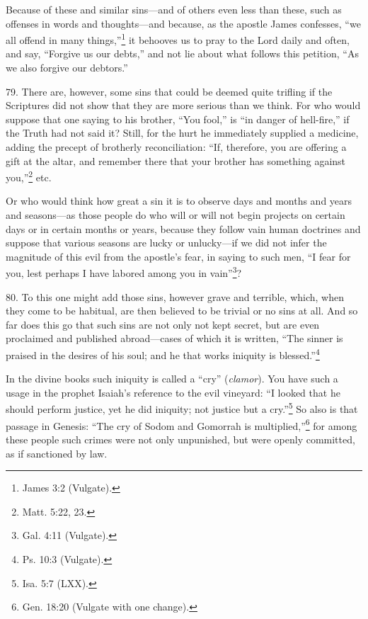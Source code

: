 Because of these and similar sins—and of others even less than these, such as offenses in words and thoughts—and because, as the apostle James confesses, ``we all offend in many things,''\footnote{James 3:2 (Vulgate).} it behooves us to pray to the Lord daily and often, and say, ``Forgive us our debts,'' and not lie about what follows this petition, ``As we also forgive our debtors.''

79. There are, however, some sins that could be deemed quite trifling if the Scriptures did not show that they are more serious than we think. For who would suppose that one saying to his brother, ``You fool,'' is ``in danger of hell-fire,'' if the Truth had not said it? Still, for the hurt he immediately supplied a medicine, adding the precept of brotherly reconciliation: ``If, therefore, you are offering a gift at the altar, and remember there that your brother has something against you,''\footnote{Matt. 5:22, 23.} etc.

Or who would think how great a sin it is to observe days and months and years and seasons—as those people do who will or will not begin projects on certain days or in certain months or years, because they follow vain human doctrines and suppose that various seasons are lucky or unlucky—if we did not infer the magnitude of this evil from the apostle's fear, in saying to such men, ``I fear for you, lest perhaps I have labored among you in vain''\footnote{Gal. 4:11 (Vulgate).}?

80. To this one might add those sins, however grave and terrible, which, when they come to be habitual, are then believed to be trivial or no sins at all. And so far does this go that such sins are not only not kept secret, but are even proclaimed and published abroad—cases of which it is written, ``The sinner is praised in the desires of his soul; and he that works iniquity is blessed.''\footnote{Ps. 10:3 (Vulgate).}

In the divine books such iniquity is called a ``cry'' (\emph{clamor}). You have such a usage in the prophet Isaiah's reference to the evil vineyard: ``I looked that he should perform justice, yet he did iniquity; not justice but a cry.''\footnote{Isa. 5:7 (LXX).} So also is that passage in Genesis: ``The cry of Sodom and Gomorrah is multiplied,''\footnote{Gen. 18:20 (Vulgate with one change).} for among these people such crimes were not only unpunished, but were openly committed, as if sanctioned by law.

